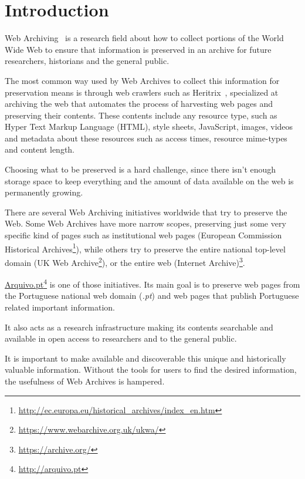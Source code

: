 \chapter{Introduction}
\label{cha:introduction}

Web Archiving~\cite{Masans2006} is a research field about how to collect portions of the World Wide Web to ensure that information is preserved in an archive for future researchers, historians and the general public.

The most common way used by Web Archives to collect this information for preservation means is through web crawlers such as Heritrix~\cite{heritrix04}, specialized at archiving the web that automates the process of harvesting web pages and preserving their contents. These contents include any resource type, such as Hyper Text Markup Language (HTML), style sheets, JavaScript, images, videos and metadata about these resources such as access times, resource mime-types and content length.

Choosing what to be preserved is a hard challenge, since there isn't enough storage space to keep everything and the amount of data available on the web is permanently growing.

There are several Web Archiving initiatives worldwide that try to preserve the Web. Some Web Archives have more narrow scopes, preserving just some very specific kind of pages such as institutional web pages (European Commission Historical Archives\footnote{\url{http://ec.europa.eu/historical_archives/index_en.htm}}), while others try to preserve the entire national top-level domain (UK Web Archive\footnote{\url{https://www.webarchive.org.uk/ukwa/}}), or the entire web (Internet Archive)\footnote{\url{https://archive.org/}}.


\href{http://www.arquivo.pt}{Arquivo.pt}\footnote{\url{http://arquivo.pt}} is one of those initiatives. Its main goal is to preserve web pages from the Portuguese national web domain (\emph{.pt}) and web pages that publish Portuguese related important information.

It also acts as a research infrastructure making its contents searchable and available in open access to researchers and to the general public.

It is important to make available and discoverable this unique and historically valuable information. Without the tools for users to find the desired information, the usefulness of Web Archives is hampered.

